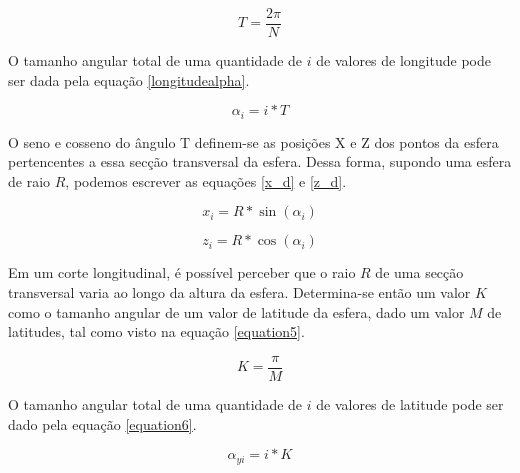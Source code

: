 \documentclass[conference]{IEEEtran}
\begin{document}

\begin{equation}
T = \frac{2 \pi}{N}
\label{longitudesize}
\end{equation}

O tamanho angular total de uma quantidade de $i$ de valores de longitude pode ser dada pela equação \ref{longitudealpha}.

\begin{equation}
\alpha_{i} = i * T
\label{longitudealpha}
\end{equation}

O seno e cosseno do ângulo T definem-se as posições X e Z dos pontos da esfera pertencentes a essa secção transversal da esfera. Dessa forma, supondo uma esfera de raio $R$, podemos escrever as equações \ref{x_d} e \ref{z_d}.

\begin{equation}
x_{i} = R * \sin(\alpha_{i})
\label{x_d}
\end{equation}

\begin{equation}
z_{i} = R * \cos(\alpha_{i})
\label{z_d}
\end{equation}

Em um corte longitudinal, é possível perceber que o raio $R$ de uma secção transversal varia ao longo da altura da esfera. Determina-se então um valor $K$ como o tamanho angular de um valor de latitude da esfera, dado um valor $M$ de latitudes, tal como visto na equação \ref{equation5}.


\begin{equation}
K = \frac{\pi}{M}
\label{equation5}
\end{equation}

O tamanho angular total de uma quantidade de $i$ de valores de latitude pode ser dado pela equação \ref{equation6}.

\begin{equation}
\alpha_{yi} = i * K
\label{equation6}
\end{equation}
\end{document}

